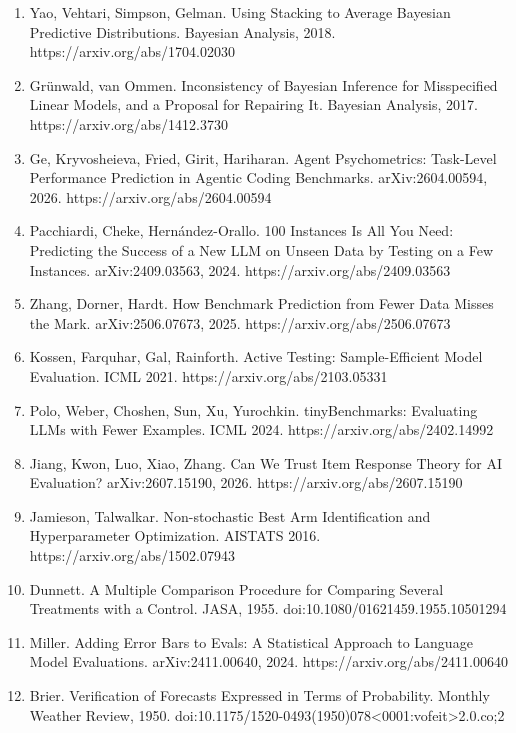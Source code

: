 \documentclass[
]{article}
\begin{document}
\begin{enumerate}
  Raventós, Paul, Chen, Ganguli. Pretraining Task Diversity and the
  Emergence of Non-Bayesian In-Context Learning for Regression. NeurIPS
  2023. https://arxiv.org/abs/2306.15063
\item
  Yao, Vehtari, Simpson, Gelman. Using Stacking to Average Bayesian
  Predictive Distributions. Bayesian Analysis, 2018.
  https://arxiv.org/abs/1704.02030
\item
  Grünwald, van Ommen. Inconsistency of Bayesian Inference for
  Misspecified Linear Models, and a Proposal for Repairing It. Bayesian
  Analysis, 2017. https://arxiv.org/abs/1412.3730
\item
  Ge, Kryvosheieva, Fried, Girit, Hariharan. Agent Psychometrics:
  Task-Level Performance Prediction in Agentic Coding Benchmarks.
  arXiv:2604.00594, 2026. https://arxiv.org/abs/2604.00594
\item
  Pacchiardi, Cheke, Hernández-Orallo. 100 Instances Is All You Need:
  Predicting the Success of a New LLM on Unseen Data by Testing on a Few
  Instances. arXiv:2409.03563, 2024. https://arxiv.org/abs/2409.03563
\item
  Zhang, Dorner, Hardt. How Benchmark Prediction from Fewer Data Misses
  the Mark. arXiv:2506.07673, 2025. https://arxiv.org/abs/2506.07673
\item
  Kossen, Farquhar, Gal, Rainforth. Active Testing: Sample-Efficient
  Model Evaluation. ICML 2021. https://arxiv.org/abs/2103.05331
\item
  Polo, Weber, Choshen, Sun, Xu, Yurochkin. tinyBenchmarks: Evaluating
  LLMs with Fewer Examples. ICML 2024. https://arxiv.org/abs/2402.14992
\item
  Jiang, Kwon, Luo, Xiao, Zhang. Can We Trust Item Response Theory for
  AI Evaluation? arXiv:2607.15190, 2026.
  https://arxiv.org/abs/2607.15190
\item
  Jamieson, Talwalkar. Non-stochastic Best Arm Identification and
  Hyperparameter Optimization. AISTATS 2016.
  https://arxiv.org/abs/1502.07943
\item
  Dunnett. A Multiple Comparison Procedure for Comparing Several
  Treatments with a Control. JASA, 1955.
  doi:10.1080/01621459.1955.10501294
\item
  Miller. Adding Error Bars to Evals: A Statistical Approach to Language
  Model Evaluations. arXiv:2411.00640, 2024.
  https://arxiv.org/abs/2411.00640
\item
  Brier. Verification of Forecasts Expressed in Terms of Probability.
  Monthly Weather Review, 1950.
  doi:10.1175/1520-0493(1950)078\textless0001:vofeit\textgreater2.0.co;2

\end{enumerate}
\end{document}
